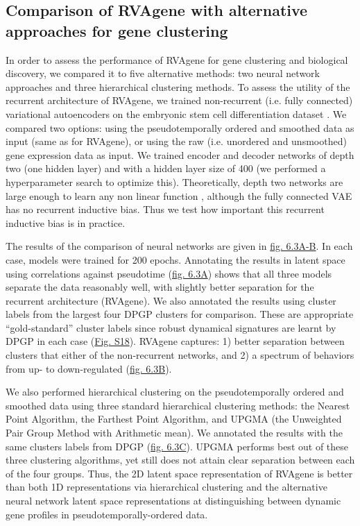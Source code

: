 \subsection{Comparison of RVAgene with alternative approaches for gene clustering}

In order to assess the performance of RVAgene for gene clustering and biological discovery, we compared it to five alternative methods: two neural network approaches and three hierarchical clustering methods. To assess the utility of the recurrent architecture of RVAgene, we trained non-recurrent (i.e. fully connected) variational autoencoders on the embryonic stem cell differentiation dataset \citep{Klein2015}. We compared two options: using the pseudotemporally ordered and smoothed data as input (same as for RVAgene), or using the raw (i.e. unordered and unsmoothed) gene expression data as input. We trained encoder and decoder networks of depth two (one hidden layer) and with a hidden layer size of 400 (we performed a hyperparameter search to optimize this). Theoretically, depth two networks are large enough to learn any non linear function \citep{cybenko1989approximation, hornik1989multilayer, funahashi1989approximate, barron1994approximation}, although the fully connected VAE has no recurrent inductive bias. Thus we test how important this recurrent inductive bias is in practice. 
\par 
The results of the comparison of neural networks are given in \hyperref[fig:fig4]{fig. 6.3A-B}. In
each case, models were trained for 200 epochs. Annotating the results in latent space using
correlations against pseudotime (\hyperref[fig:fig4]{fig. 6.3A}) shows that all three models
separate the data reasonably well, with slightly better separation for the recurrent architecture
(RVAgene). We also annotated the results using cluster labels from the largest four DPGP clusters
for comparison. These are appropriate ``gold-standard'' cluster labels since robust dynamical
signatures are learnt by DPGP in each case (\hyperref[fig:figS3]{Fig. S18}). RVAgene captures: 1) better
separation between clusters that either of the non-recurrent networks, and 2) a spectrum of
behaviors from up- to down-regulated (\hyperref[fig:fig4]{fig. 6.3B}).
\par 
We also performed hierarchical clustering on the pseudotemporally ordered and smoothed data using
three standard hierarchical clustering methods: the Nearest Point Algorithm, the Farthest Point
Algorithm, and UPGMA (the Unweighted Pair Group Method with Arithmetic mean). We annotated the
results with the same clusters labels from DPGP (\hyperref[fig:fig4]{fig. 6.3C}). UPGMA performs best out of these three clustering algorithms, yet still does not attain clear separation between each of the four groups. Thus, the 2D latent space representation of RVAgene is better than both 1D representations via hierarchical clustering and the alternative neural network latent space representations at distinguishing between dynamic gene profiles in pseudotemporally-ordered data.



